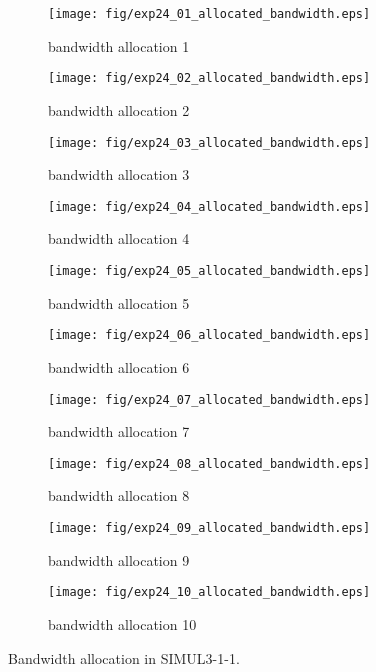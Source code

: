 	\begin{figure}
		\begin{center}
			\begin{subfigure}[b]{0.32\textwidth}
				\texttt{[image: fig/exp24\_01\_allocated\_bandwidth.eps]}
				\caption{bandwidth allocation 1}
				\label{figure:simul3_1_1_b_a}
			\end{subfigure}
			\begin{subfigure}[b]{0.32\textwidth}
				\texttt{[image: fig/exp24\_02\_allocated\_bandwidth.eps]}
				\caption{bandwidth allocation 2}
				\label{figure:simul3_1_1_b_b}
			\end{subfigure}
			\begin{subfigure}[b]{0.32\textwidth}
				\texttt{[image: fig/exp24\_03\_allocated\_bandwidth.eps]}
				\caption{bandwidth allocation 3}
				\label{figure:simul3_1_1_b_c}
			\end{subfigure}
			\begin{subfigure}[b]{0.32\textwidth}
				\texttt{[image: fig/exp24\_04\_allocated\_bandwidth.eps]}
				\caption{bandwidth allocation 4}
				\label{figure:simul3_1_1_b_d}
			\end{subfigure}
			\begin{subfigure}[b]{0.32\textwidth}
				\texttt{[image: fig/exp24\_05\_allocated\_bandwidth.eps]}
				\caption{bandwidth allocation 5}
				\label{figure:simul3_1_1_b_e}
			\end{subfigure}
			\begin{subfigure}[b]{0.32\textwidth}
				\texttt{[image: fig/exp24\_06\_allocated\_bandwidth.eps]}
				\caption{bandwidth allocation 6}
				\label{figure:simul3_1_1_b_f}
			\end{subfigure}
			\begin{subfigure}[b]{0.32\textwidth}
				\texttt{[image: fig/exp24\_07\_allocated\_bandwidth.eps]}
				\caption{bandwidth allocation 7}
				\label{figure:simul3_1_1_b_g}
			\end{subfigure}
			\begin{subfigure}[b]{0.32\textwidth}
				\texttt{[image: fig/exp24\_08\_allocated\_bandwidth.eps]}
				\caption{bandwidth allocation 8}
				\label{figure:simul3_1_1_b_h}
			\end{subfigure}
			\begin{subfigure}[b]{0.32\textwidth}
				\texttt{[image: fig/exp24\_09\_allocated\_bandwidth.eps]}
				\caption{bandwidth allocation 9}
				\label{figure:simul3_1_1_b_i}
			\end{subfigure}
			\begin{subfigure}[b]{0.32\textwidth}
				\texttt{[image: fig/exp24\_10\_allocated\_bandwidth.eps]}
				\caption{bandwidth allocation 10}
				\label{figure:simul3_1_1_b_j}
			\end{subfigure}
			\caption{Bandwidth allocation in SIMUL3-1-1.}
			\label{figure:simul3_1_1_ba}
		\end{center}
	\end{figure}


